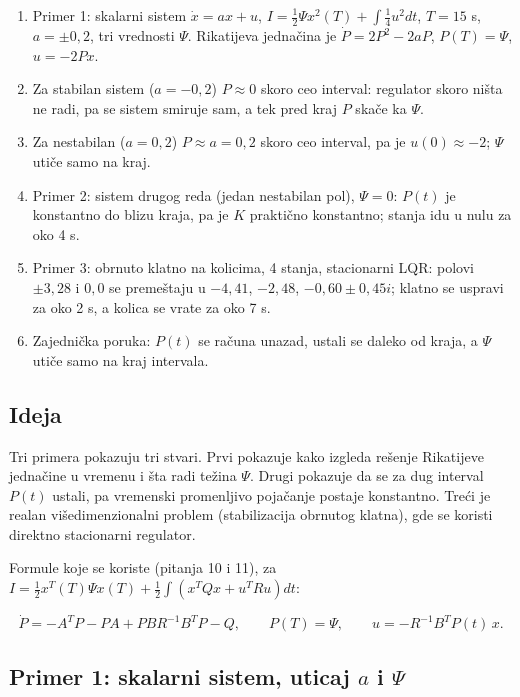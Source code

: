 \documentclass[11pt,a4paper,parskip=half,headsepline,numbers=noenddot]{scrartcl}
\begin{document}
\begin{kljucna}
\begin{enumerate}
\def\labelenumi{\arabic{enumi}.}
\item Primer 1: skalarni sistem \(\dot x = ax + u\), \(I = \frac12\Psi x^2(T) + \int\frac14u^2dt\), \(T = 15\) s, \(a = \pm0{,}2\), tri vrednosti \(\Psi\). Rikatijeva jednačina je \(\dot P = 2P^2 - 2aP\), \(P(T) = \Psi\), \(u = -2Px\).
\item Za stabilan sistem (\(a = -0{,}2\)) \(P \approx 0\) skoro ceo interval: regulator skoro ništa ne radi, pa se sistem smiruje sam, a tek pred kraj \(P\) skače ka \(\Psi\).
\item Za nestabilan (\(a = 0{,}2\)) \(P \approx a = 0{,}2\) skoro ceo interval, pa je \(u(0) \approx -2\); \(\Psi\) utiče samo na kraj.
\item Primer 2: sistem drugog reda (jedan nestabilan pol), \(\Psi = 0\): \(P(t)\) je konstantno do blizu kraja, pa je \(K\) praktično konstantno; stanja idu u nulu za oko 4 s.
\item Primer 3: obrnuto klatno na kolicima, 4 stanja, stacionarni LQR: polovi \(\pm3{,}28\) i \(0, 0\) se premeštaju u \(-4{,}41\), \(-2{,}48\), \(-0{,}60 \pm 0{,}45i\); klatno se uspravi za oko 2 s, a kolica se vrate za oko 7 s.
\item Zajednička poruka: \(P(t)\) se računa unazad, ustali se daleko od kraja, a \(\Psi\) utiče samo na kraj intervala.
\end{enumerate}
\end{kljucna}

\subsection{Ideja}

Tri primera pokazuju tri stvari. Prvi pokazuje kako izgleda rešenje Rikatijeve jednačine u vremenu i šta radi težina \(\Psi\). Drugi pokazuje da se za dug interval \(P(t)\) ustali, pa vremenski promenljivo pojačanje postaje konstantno. Treći je realan višedimenzionalni problem (stabilizacija obrnutog klatna), gde se koristi direktno stacionarni regulator.

Formule koje se koriste (pitanja 10 i 11), za \(I = \frac12x^T(T)\Psi x(T) + \frac12\int(x^TQx + u^TRu)dt\):

\[\dot P = -A^TP - PA + PBR^{-1}B^TP - Q, \qquad P(T) = \Psi, \qquad u = -R^{-1}B^TP(t)\,x .\]

\subsection{\texorpdfstring{Primer 1: skalarni sistem, uticaj \(a\) i \(\Psi\)}{Primer 1: skalarni sistem, uticaj a i \textbackslash Psi}}
\end{document}
